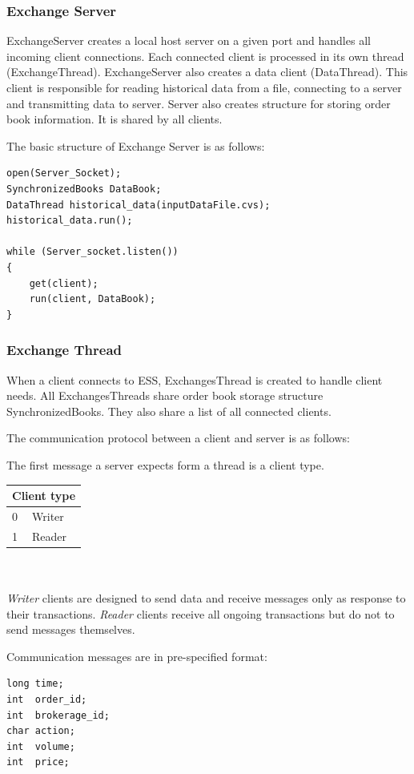 \documentclass[14pt]{article}
\begin{document}
\subsubsection{Exchange Server}
ExchangeServer creates a local host server on a given port and handles all incoming client connections. Each connected client is processed in its own thread (ExchangeThread). ExchangeServer also creates a data client (DataThread). This client is responsible for reading historical data from a file, connecting to a server and transmitting data to server. Server also creates structure for storing order book information. It is shared by all clients.

\noindent The basic structure of Exchange Server is as follows:
\begin{verbatim}
open(Server_Socket);
SynchronizedBooks DataBook;
DataThread historical_data(inputDataFile.cvs);
historical_data.run();

while (Server_socket.listen())
{
    get(client);
    run(client, DataBook);
}
\end{verbatim}


\subsubsection{Exchange Thread}
When a client connects to ESS, ExchangesThread is created to handle client needs. All ExchangesThreads share order book storage structure SynchronizedBooks. They also share a list of all connected clients.

\noindent The communication protocol between a client and server is as follows: 

\noindent The first message a server expects form a thread is a client type.

\begin{tabular}{|l|l|}
  \hline
  \multicolumn{2}{|c|}{Client type} \\
  \hline
  0 & Writer\\ \hline
  1 & Reader \\
  \hline
\end{tabular}
\\
\\
\emph{Writer} clients are designed to send data and receive messages only as response to their transactions. \emph{Reader} clients receive all ongoing transactions but do not to send messages themselves.

Communication messages  are in pre-specified format:

\begin{verbatim}
long time;
int  order_id;
int  brokerage_id;
char action;
int  volume;
int  price;
\end{verbatim}
\end{document}

